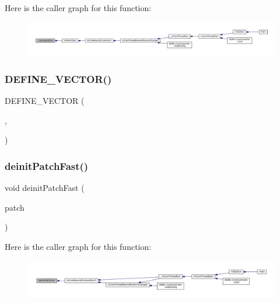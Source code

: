 Here is the caller graph for this function\+:
\nopagebreak
\begin{figure}[H]
\begin{center}
\leavevmode
\includegraphics[width=350pt]{patch-fast_8c_a52ac89ce08d7d452245d71aa0d305d6e_icgraph}
\end{center}
\end{figure}
\mbox{\label{patch-fast_8c_a3b7b97068b1dc4bcadd2440bcdc94896}} 
\subsubsection{\texorpdfstring{D\+E\+F\+I\+N\+E\+\_\+\+V\+E\+C\+T\+O\+R()}{DEFINE\_VECTOR()}}
{\footnotesize\ttfamily D\+E\+F\+I\+N\+E\+\_\+\+V\+E\+C\+T\+OR (\begin{DoxyParamCaption}\item[{Patch\+Fast\+Extents}]{,  }\item[{struct Patch\+Fast\+Extent}]{ }\end{DoxyParamCaption})}

\mbox{\label{patch-fast_8c_ad79a733de65415ee6177fe21ce66234d}} 
\subsubsection{\texorpdfstring{deinit\+Patch\+Fast()}{deinitPatchFast()}}
{\footnotesize\ttfamily void deinit\+Patch\+Fast (\begin{DoxyParamCaption}\item[{struct Patch\+Fast $\ast$}]{patch }\end{DoxyParamCaption})}

Here is the caller graph for this function\+:
\nopagebreak
\begin{figure}[H]
\begin{center}
\leavevmode
\includegraphics[width=350pt]{patch-fast_8c_ad79a733de65415ee6177fe21ce66234d_icgraph}
\end{center}
\end{figure}
\mbox{\label{patch-fast_8c_a8cb66d058df5b15ef53ab862be14f59d}} 
